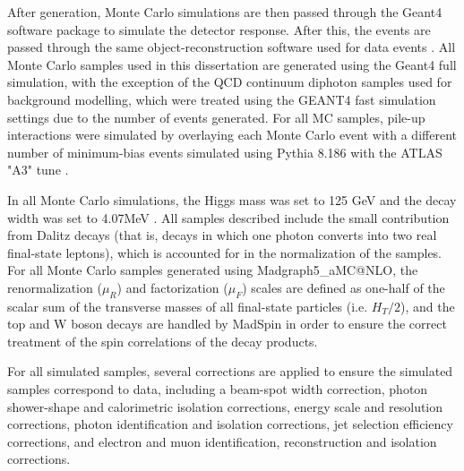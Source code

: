After generation, Monte Carlo simulations are then passed through the Geant4 software package \cite{GEANT4} to simulate the detector response. After this, the events are passed through the same object-reconstruction software used for data events \cite{Aad_2010}. All Monte Carlo samples used in this dissertation are generated using the Geant4 full simulation, with the exception of the QCD continuum diphoton samples used for background modelling, which were treated using the GEANT4 fast simulation settings due to the number of events generated. For all MC samples, pile-up interactions were simulated by overlaying each Monte Carlo event with a different number of minimum-bias events simulated using Pythia 8.186 \cite{Pythia8.1} with the ATLAS "A3" tune \cite{A3}.

In all Monte Carlo simulations, the Higgs mass was set to 125 GeV and the decay width was set to 4.07MeV \cite{YellowReport4}. All samples described include the small contribution from Dalitz decays (that is, decays in which one photon converts into two real final-state leptons), which is accounted for in the normalization of the samples. For all Monte Carlo samples generated using {Madgraph5\_aMC@NLO}, the renormalization ($\mu_{R}$) and factorization ($\mu_{F}$) scales are defined as one-half of the scalar sum of the transverse masses of all final-state particles (i.e. $H_{T}/2$), and the top and W boson decays are handled by MadSpin \cite{MadSpin} in order to ensure the correct treatment of the spin correlations of the decay products.

For all simulated samples, several corrections are applied to ensure the simulated samples correspond to data, including a beam-spot width correction, photon shower-shape and calorimetric isolation corrections, energy scale and resolution corrections, photon identification and isolation corrections, jet selection efficiency corrections, and electron and muon identification, reconstruction and isolation corrections.

